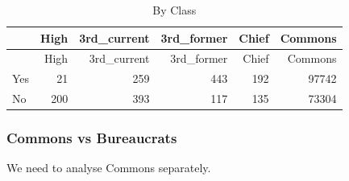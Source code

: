 \documentclass[
]{article}
\newenvironment{Shaded}{\begin{snugshade}}{\end{snugshade}}
\newcommand{\DataTypeTok}[1]{\textcolor[rgb]{0.13,0.29,0.53}{#1}}
\newcommand{\DecValTok}[1]{\textcolor[rgb]{0.00,0.00,0.81}{#1}}
\newcommand{\KeywordTok}[1]{\textcolor[rgb]{0.13,0.29,0.53}{\textbf{#1}}}
\newcommand{\NormalTok}[1]{#1}
\newcommand{\OperatorTok}[1]{\textcolor[rgb]{0.81,0.36,0.00}{\textbf{#1}}}
\newcommand{\StringTok}[1]{\textcolor[rgb]{0.31,0.60,0.02}{#1}}
\begin{document}
\begin{longtable}[]{@{}lrrrrr@{}}
\caption{By Class}\tabularnewline
\toprule
& High & 3rd\_current & 3rd\_former & Chief & Commons\tabularnewline
\midrule
\endfirsthead
\toprule
& High & 3rd\_current & 3rd\_former & Chief & Commons\tabularnewline
\midrule
\endhead
Yes & 21 & 259 & 443 & 192 & 97742\tabularnewline
No & 200 & 393 & 117 & 135 & 73304\tabularnewline
\bottomrule
\end{longtable}

\hypertarget{commons-vs-bureaucrats}{%
\subsubsection{Commons vs Bureaucrats}\label{commons-vs-bureaucrats}}

We need to analyse Commons separately.

\begin{Shaded}
\end{Shaded}
\end{document}
